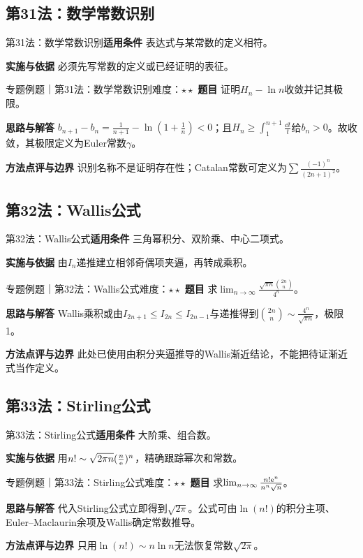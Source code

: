 \subsection{第31法：数学常数识别}\label{mat:limits_35:k31}
\begin{method}{第31法：数学常数识别}\textbf{适用条件} 表达式与某常数的定义相符。\par\textbf{实施与依据} 必须先写常数的定义或已经证明的表征。\end{method}
\begin{example}{专题例题｜第31法：数学常数识别}{难度：$\star\star$}
\textbf{题目} 证明$H_n-\ln n$收敛并记其极限。\par\textbf{思路与解答} $b_{n+1}-b_n=\frac{1}{n+1}-\ln(1+\frac{1}{n})<0$；且$H_n\ge\int_1^{n+1}\frac{\dd t}{t}$给$b_n>0$。故收敛，其极限定义为Euler常数$\gamma$。\par\textbf{方法点评与边界} 识别名称不是证明存在性；Catalan常数可定义为$\sum\frac{(-1)^n}{(2n+1)^2}$。
\end{example}
\subsection{第32法：Wallis公式}\label{mat:limits_35:k32}
\begin{method}{第32法：Wallis公式}\textbf{适用条件} 三角幂积分、双阶乘、中心二项式。\par\textbf{实施与依据} 由$I_n$递推建立相邻奇偶项夹逼，再转成乘积。\end{method}
\begin{example}{专题例题｜第32法：Wallis公式}{难度：$\star\star$}
\textbf{题目} 求$\lim_{n\to\infty}\frac{\sqrt{\pi n}\binom{2n}{n}}{4^n}$。\par\textbf{思路与解答} Wallis乘积或由$I_{2n+1}\le I_{2n}\le I_{2n-1}$与递推得到$\binom{2n}{n}\sim\frac{4^n}{\sqrt{\pi n}}$，极限1。\par\textbf{方法点评与边界} 此处已使用由积分夹逼推导的Wallis渐近结论，不能把待证渐近式当作定义。
\end{example}
\subsection{第33法：Stirling公式}\label{mat:limits_35:k33}
\begin{method}{第33法：Stirling公式}\textbf{适用条件} 大阶乘、组合数。\par\textbf{实施与依据} 用$n!\sim\sqrt{2\pi n}(\frac{n}{\mathrm{e}})^n$，精确跟踪幂次和常数。\end{method}
\begin{example}{专题例题｜第33法：Stirling公式}{难度：$\star\star$}
\textbf{题目} 求$\lim_{n\to\infty}\frac{n!\mathrm{e}^n}{n^n\sqrt n}$。\par\textbf{思路与解答} 代入Stirling公式立即得到$\sqrt{2\pi}$。公式可由$\ln(n!)$的积分主项、Euler--Maclaurin余项及Wallis确定常数推导。\par\textbf{方法点评与边界} 只用$\ln(n!)\sim n\ln n$无法恢复常数$\sqrt{2\pi}$。
\end{example}
